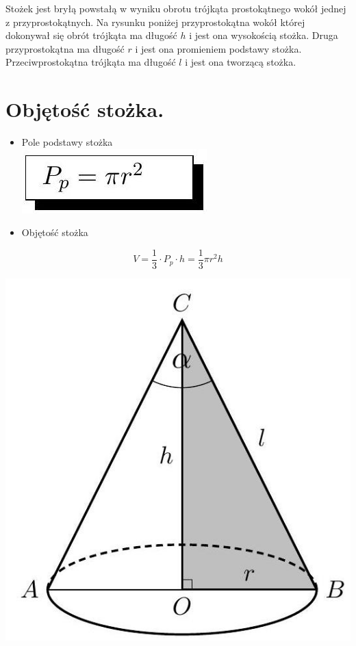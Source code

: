 \documentclass[10pt]{article}
\begin{document}
Stożek jest bryłą powstałą w wyniku obrotu trójkąta prostokątnego wokół jednej z przyprostokątnych. Na rysunku poniżej przyprostokątna wokół której dokonywał się obrót trójkąta ma długość \(h\) i jest ona wysokością stożka. Druga przyprostokątna ma długość \(r\) i jest ona promieniem podstawy stożka. Przeciwprostokątna trójkąta ma długość \(l\) i jest ona tworzącą stożka.

\section*{Objętość stożka.}
\begin{itemize}
  \item Pole podstawy stożka\\
\includegraphics[max width=\textwidth, center]{2024_11_21_e9b4faa005d5be2cc318g-096}
  \item Objętość stożka
\end{itemize}

\[
V=\frac{1}{3} \cdot P_{p} \cdot h=\frac{1}{3} \pi r^{2} h
\]

\begin{center}
\includegraphics[max width=\textwidth]{2024_11_21_e9b4faa005d5be2cc318g-096(1)}
\end{center}
\end{document}
